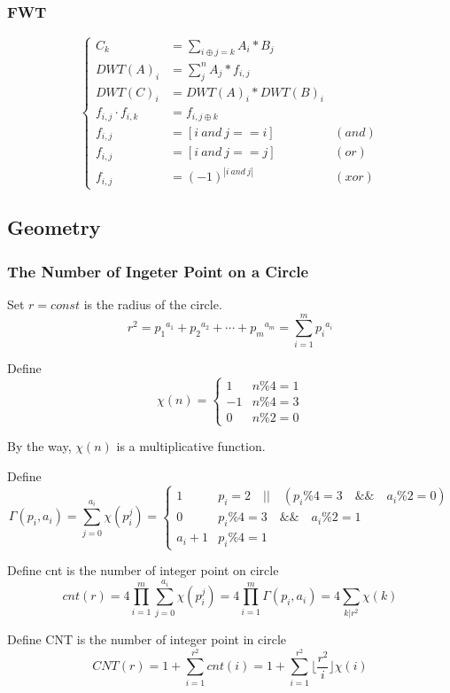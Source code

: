 \documentclass[10pt]{ctexart}
\begin{document}
{{\subsubsection{FWT}
\begin{equation*}
\left\{
    \begin{aligned}
        C_k&=\sum_{i\oplus j=k}A_i*B_j \\
        DWT(A)_i&=\sum_j^nA_j*f_{i,j} \\
        DWT(C)_i&=DWT(A)_i*DWT(B)_i\\
        f_{i,j} \cdot f_{i,k} &=f_{i,j\oplus k}\\
        f_{i,j} &= [i \ and \ j == i] \  &(and)\\
        f_{i,j} &= [i \  and \  j == j] \ &(or)\\
        f_{i,j} &= (-1)^{| i \  and \  j |} \ &(xor)
    \end{aligned}
\right.
\end{equation*}
\subsection{Geometry}
\subsubsection{The Number of Ingeter Point on a Circle}
Set $r = const$ is the radius of the circle.
$$r^2 = {p_1}^{a_1} + {p_2}^{a_2} + \cdots + {p_m}^{a_m} = \sum_{i = 1}^{m} {p_i}^{a_i}$$
\par 
Define
\[
    \chi(n)=
    \begin{cases}
        1 & {n \% 4 = 1} \\
        -1 & {n \% 4 = 3} \\
        0 & {n \% 2 = 0}
    \end{cases}
\]
\par
By the way, $\chi(n)$ is a multiplicative function. 
\par
Define
\[
    \Gamma(p_i,a_i)=\sum_{j = 0}^{a_i}\chi(p_i^j)=
    \begin{cases}
        1 & {p_i = 2 \quad || \quad (p_i \% 4 = 3 \quad \&\& \quad a_i \% 2 = 0)} \\
        0 & {p_i \% 4 = 3 \quad \&\& \quad a_i \% 2 = 1} \\
        a_i + 1 & {p_i \% 4 = 1}
    \end{cases}
\]
\par
Define cnt is the number of integer point on circle
$$cnt(r) = 4 \prod_{i = 1}^{m} \sum_{j = 0}^{a_i} \chi(p_i^j) = 4 \prod_{i = 1}^{m} \Gamma(p_i,a_i) = 4 \sum_{k | r^2}\chi(k)$$
\par
Define CNT is the number of integer point in circle
$$CNT(r) = 1 + \sum_{i = 1}^{r^2}cnt(i) = 1 + \sum_{i = 1}^{r^2} \lfloor \frac{r^2}{i} \rfloor \chi(i)$$





}}
\end{document}
